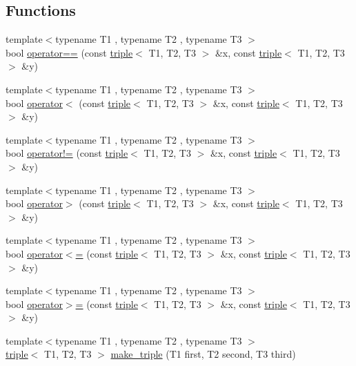 \subsection*{Functions}
\begin{DoxyCompactItemize}
\item 
{\footnotesize template$<$typename T1 , typename T2 , typename T3 $>$ }\\bool \hyperlink{contrafold_2_utilities_8ipp_a9e90b0cdf49405cc0f56918fbeecae47}{operator==} (const \hyperlink{structtriple}{triple}$<$ T1, T2, T3 $>$ \&x, const \hyperlink{structtriple}{triple}$<$ T1, T2, T3 $>$ \&y)
\item 
{\footnotesize template$<$typename T1 , typename T2 , typename T3 $>$ }\\bool \hyperlink{contrafold_2_utilities_8ipp_af53bc7b3a1cb11396c78145a19591b23}{operator$<$} (const \hyperlink{structtriple}{triple}$<$ T1, T2, T3 $>$ \&x, const \hyperlink{structtriple}{triple}$<$ T1, T2, T3 $>$ \&y)
\item 
{\footnotesize template$<$typename T1 , typename T2 , typename T3 $>$ }\\bool \hyperlink{contrafold_2_utilities_8ipp_a14c9410b6dcc41a0f69c1479f30f164f}{operator!=} (const \hyperlink{structtriple}{triple}$<$ T1, T2, T3 $>$ \&x, const \hyperlink{structtriple}{triple}$<$ T1, T2, T3 $>$ \&y)
\item 
{\footnotesize template$<$typename T1 , typename T2 , typename T3 $>$ }\\bool \hyperlink{contrafold_2_utilities_8ipp_a593a75c25abcb081665eb3e13e138db0}{operator$>$} (const \hyperlink{structtriple}{triple}$<$ T1, T2, T3 $>$ \&x, const \hyperlink{structtriple}{triple}$<$ T1, T2, T3 $>$ \&y)
\item 
{\footnotesize template$<$typename T1 , typename T2 , typename T3 $>$ }\\bool \hyperlink{contrafold_2_utilities_8ipp_a8546112ccb3887f55cccb11caecbca4f}{operator$<$=} (const \hyperlink{structtriple}{triple}$<$ T1, T2, T3 $>$ \&x, const \hyperlink{structtriple}{triple}$<$ T1, T2, T3 $>$ \&y)
\item 
{\footnotesize template$<$typename T1 , typename T2 , typename T3 $>$ }\\bool \hyperlink{contrafold_2_utilities_8ipp_af2dfb1bb3969d1ba0df470c8ce42c7fa}{operator$>$=} (const \hyperlink{structtriple}{triple}$<$ T1, T2, T3 $>$ \&x, const \hyperlink{structtriple}{triple}$<$ T1, T2, T3 $>$ \&y)
\item 
{\footnotesize template$<$typename T1 , typename T2 , typename T3 $>$ }\\\hyperlink{structtriple}{triple}$<$ T1, T2, T3 $>$ \hyperlink{contrafold_2_utilities_8ipp_a765162c27da3c4c997099267c3d3fe07}{make\+\_\+triple} (T1 first, T2 second, T3 third)

\end{DoxyCompactItemize}
